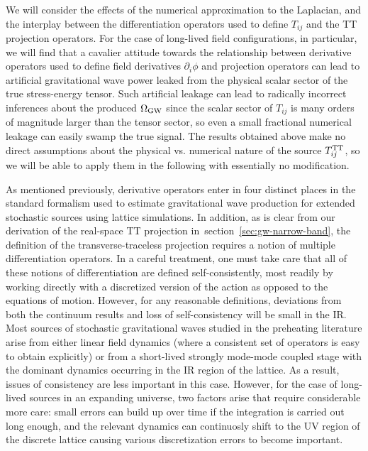 \documentclass{revtex4}
\newcommand{\secref}[1]{section~\ref{#1}}
\begin{document}
We will consider the effects of the numerical approximation to the Laplacian, and the interplay between the differentiation operators used to define $T_{ij}$ and the TT projection operators.
For the case of long-lived field configurations, in particular, we will find that a cavalier attitude towards the relationship between derivative operators used to define field derivatives $\partial_i\phi$ and projection operators can lead to artificial gravitational wave power leaked from the physical scalar sector of the true stress-energy tensor.
Such artificial leakage can lead to radically incorrect inferences about the produced $\Omega_{\rm GW}$ since the scalar sector of $T_{ij}$ is many orders of magnitude larger than the tensor sector, so even a small fractional numerical leakage can easily swamp the true signal.
The results obtained above make no direct assumptions about the physical vs. numerical nature of the source $T_{ij}^{{\rm TT}}$, so we will be able to apply them in the following with essentially no modification.


As mentioned previously, derivative operators enter in four distinct places in the standard formalism used to estimate gravitational wave production for extended stochastic sources using lattice simulations.
In addition, as is clear from our derivation of the real-space TT projection in~\secref{sec:gw-narrow-band}, the definition of the transverse-traceless projection requires a notion of multiple differentiation operators.
In a careful treatment, one must take care that all of these notions of differentiation are defined self-consistently, most readily by working directly with a discretized version of the action as opposed to the equations of motion.
However, for any reasonable definitions, deviations from both the continuum results and loss of self-consistency will be small in the IR.
Most sources of stochastic gravitational waves studied in the preheating literature arise from either linear field dynamics (where a consistent set of operators is easy to obtain explicitly) or from a short-lived strongly mode-mode coupled stage with the dominant dynamics occurring in the IR region of the lattice.
As a result, issues of consistency are less important in this case.
However, for the case of long-lived sources in an expanding universe, two factors arise that require considerable more care: small errors can build up over time if the integration is carried out long enough, and the relevant dynamics can continuosly shift to the UV region of the discrete lattice causing various discretization errors to become important.
\end{document}
